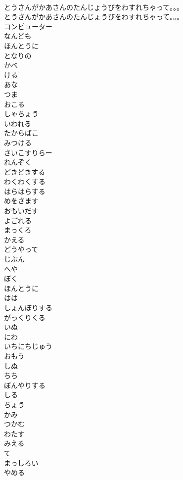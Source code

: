 \documentclass[8pt]{extreport}
\begin{document}
\begin{CJK}{UTF8}{min}
\\	とうさんがかあさんのたんじょうびをわすれちゃって。。。	
\\	とうさんがかあさんのたんじょうびをわすれちゃって。。。 
\\	コンピューター
\\	なんども
\\	ほんとうに
\\	となりの
\\	かべ
\\	ける
\\	あな
\\	つま
\\	おこる
\\	しゃちょう
\\	いわれる
\\	たからばこ
\\	みつける
\\	さいこすりらー
\\	れんぞく
\\	どきどきする
\\	わくわくする
\\	はらはらする
\\	めをさます
\\	おもいだす
\\	よごれる
\\	まっくろ
\\	かえる
\\	どうやって
\\	じぶん
\\	へや
\\	ぼく
\\	ほんとうに
\\	はは
\\	しょんぼりする
\\	がっくりくる
\\	いぬ
\\	にわ
\\	いちにちじゅう
\\	おもう
\\	しぬ
\\	ちち
\\	ぼんやりする
\\	しる
\\	ちょう
\\	かみ
\\	つかむ
\\	わたす
\\	みえる
\\	て
\\	まっしろい
\\	やめる

\end{CJK}
\end{document}
